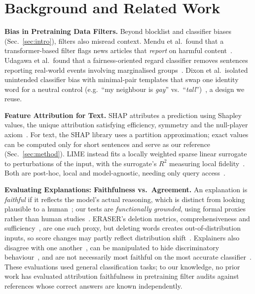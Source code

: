 
\section{Background and Related Work}\label{sec:background}

\noindent\textbf{Bias in Pretraining Data Filters.}
Beyond blocklist and classifier biases (Sec.~\ref{sec:intro}), filters also misread context.
Mendu et al.\ found that a transformer-based filter flags news articles that \emph{report} on harmful content~\cite{mendu2025safer}.
Udagawa et al.\ found that a fairness-oriented regard classifier removes sentences reporting real-world events involving marginalised groups~\cite{udagawa2025bias}.
Dixon et al.\ isolated unintended classifier bias with minimal-pair templates that swap one identity word for a neutral control (e.g.\ ``my neighbour is \emph{gay}'' vs.\ ``\emph{tall}'')~\cite{dixon2018measuring}, a design we reuse.

\smallskip
\noindent\textbf{Feature Attribution for Text.}
SHAP attributes a prediction using Shapley values, the unique attribution satisfying efficiency, symmetry and the null-player axiom~\cite{lundberg2017unified}.
For text, the SHAP library uses a partition approximation; exact values can be computed only for short sentences and serve as our reference (Sec.~\ref{sec:method}).
LIME instead fits a locally weighted sparse linear surrogate to perturbations of the input, with the surrogate's $R^2$ measuring local fidelity~\cite{ribeiro2016why}.
Both are post-hoc, local and model-agnostic, needing only query access~\cite{munn2022xai,molnar2022iml}.

\smallskip
\noindent\textbf{Evaluating Explanations: Faithfulness vs.\ Agreement.}
An explanation is \emph{faithful} if it reflects the model's actual reasoning, which is distinct from looking plausible to a human~\cite{jacovi2020faithfully}; our tests are \emph{functionally grounded}, using formal proxies rather than human studies~\cite{doshivelez2017rigorous}.
ERASER's deletion metrics, comprehensiveness and sufficiency~\cite{deyoung2020eraser}, are one such proxy, but deleting words creates out-of-distribution inputs, so score changes may partly reflect distribution shift~\cite{hase2021ood}.
Explainers also disagree with one another~\cite{krishna2022disagreement}, can be manipulated to hide discriminatory behaviour~\cite{slack2020fooling}, and are not necessarily most faithful on the most accurate classifier~\cite{ngueajio2025decoding}.
These evaluations used general classification tasks; to our knowledge, no prior work has evaluated attribution faithfulness in pretraining filter audits against references whose correct answers are known independently.
